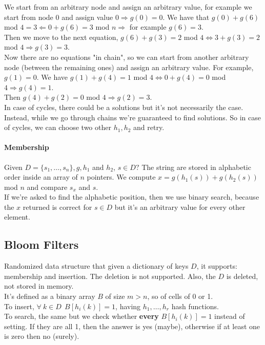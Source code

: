 \documentclass[10pt]{report}
\begin{document}
We start from an arbitrary node and assign an arbitrary value, for example we start from node $0$ and assign value $0 \Rightarrow g(0)=0$. We have that $g(0)+g(6)$ mod $4 = 3 \Leftarrow 0 + g(6) = 3$ mod $n \Rightarrow$ for example $g(6) = 3$.\\
Then we move to the next equation, $g(6) + g(3) = 2$ mod $4\Leftrightarrow 3 + g(3) = 2$ mod $4 \Rightarrow g(3) = 3$.\\
Now there are no equations "in chain", so we can start from another arbitrary node (between the remaining ones) and assign an arbitrary value. For example, $g(1)=0$. We have $g(1)+g(4)=1$ mod $4\Leftrightarrow 0 + g(4) = 0$ mod $4\Rightarrow g(4) = 1$.\\
Then $g(4)+g(2) = 0$ mod $4\Rightarrow g(2)=3$.\\
In case of cycles, there could be a solutions but it's not necessarily the case. Instead, while we go through chains we're guaranteed to find solutions. So in case of cycles, we can choose two other $h_1,h_2$ and retry.
\paragraph{Membership} Given $D=\{s_1,\ldots,s_n\}, g, h_1$ and $h_2$, $s\in D?$ The string are stored in alphabetic order inside an array of $n$ pointers. We compute $x=g(h_1(s))+g(h_2(s))$ mod $n$ and compare $s_x$ and $s$.\\
If we're asked to find the alphabetic position, then we use binary search, because the $x$ returned is correct for $s\in D$ but it's an arbitrary value for every other element.
\subsection{Bloom Filters} Randomized data structure that given a dictionary of keys $D$, it supports: membership and insertion. The deletion is not supported. Also, the $D$ is deleted, not stored in memory.\\
It's defined as a binary array $B$ of size $m>n$, so of cells of 0 or 1.\\
To insert, $\forall\:k\in D\:\:B[h_i(k)]=1$, having $h_1,\ldots,h_r$ hash functions.\\
To search, the same but we check whether \textbf{every} $B[h_i(k)]=1$ instead of setting. If they are all 1, then the answer is yes (maybe), otherwise if at least one is zero then no (surely).
\end{document}
